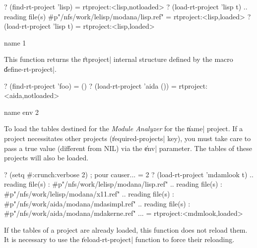 \begin{Code*}
? (find-rt-project 'lisp)
= rtproject:<lisp,notloaded>
? (load-rt-project 'lisp t)
.. reading file(s) #p"/nfs/work/lelisp/modana/lisp.ref"
= rtproject:<lisp,loaded>
? (load-rt-project 'lisp t)
= rtproject:<lisp,loaded>
\end{Code*}

%

 {name} {1}

This function returns the \|rtproject| internal structure defined by the macro \|define-rt-project|.

\begin{Code*}
? (find-rt-project 'foo)
= ()
? (load-rt-project 'aida ())
= rtproject:<aida,notloaded>
\end{Code*}

 {name env} {2}

To load the tables destined for the {\em Module Analyzer} for the \|name| project.  If a project necessitates other projects (\|required-projects| key), you must take care to pass a true value (different from NIL) via the \|env| parameter.  The tables of these projects will also be loaded. 

\begin{Code*}
? (setq #:crunch:verbose 2) ; pour causer...
= 2
? (load-rt-project 'mdamlook t)
.. reading file(s) : #p"/nfs/work/lelisp/modana/lisp.ref"
.. reading file(s) : #p"/nfs/work/lelisp/modana/x11.ref"
.. reading file(s) : #p"/nfs/work/aida/modana/mdasimpl.ref"
.. reading file(s) : #p"/nfs/work/aida/modana/mdakerne.ref"
...
= rtproject:<mdmlook,loaded>
\end{Code*}

If the tables of a project are already loaded, this function does not reload them.  It is necessary to use the \|reload-rt-project| function to force their reloading.

